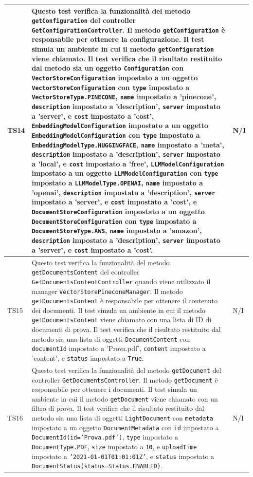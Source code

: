 \documentclass[10pt, a4paper]{article}
\begin{document}
\begin{xltabular}{\textwidth}{p{0.12\textwidth}|X|p{0.12\textwidth}}
    \hline
    TS14 & Questo test verifica la funzionalità del metodo \texttt{getConfiguration} del controller \texttt{GetConfigurationController}. Il metodo \texttt{getConfiguration} è responsabile per ottenere la configurazione. Il test simula un ambiente in cui il metodo \texttt{getConfiguration} viene chiamato. Il test verifica che il risultato restituito dal metodo sia un oggetto \texttt{Configuration} con \texttt{VectorStoreConfiguration} impostato a un oggetto \texttt{VectorStoreConfiguration} con \texttt{type} impostato a \texttt{VectorStoreType.PINECONE}, \texttt{name} impostato a 'pinecone', \texttt{description} impostato a 'description', \texttt{server} impostato a 'server', e \texttt{cost} impostato a 'cost', \texttt{EmbeddingModelConfiguration} impostato a un oggetto \texttt{EmbeddingModelConfiguration} con \texttt{type} impostato a \texttt{EmbeddingModelType.HUGGINGFACE}, \texttt{name} impostato a 'meta', \texttt{description} impostato a 'description', \texttt{server} impostato a 'local', e \texttt{cost} impostato a 'free', \texttt{LLMModelConfiguration} impostato a un oggetto \texttt{LLMModelConfiguration} con \texttt{type} impostato a \texttt{LLMModelType.OPENAI}, \texttt{name} impostato a 'openai', \texttt{description} impostato a 'description', \texttt{server} impostato a 'server', e \texttt{cost} impostato a 'cost', e \texttt{DocumentStoreConfiguration} impostato a un oggetto \texttt{DocumentStoreConfiguration} con \texttt{type} impostato a \texttt{DocumentStoreType.AWS}, \texttt{name} impostato a 'amazon', \texttt{description} impostato a 'description', \texttt{server} impostato a 'server', e \texttt{cost} impostato a 'cost'. & N/I \\
    \hline
    TS15 & Questo test verifica la funzionalità del metodo \texttt{getDocumentsContent} del controller \texttt{GetDocumentsContentController} quando viene utilizzato il manager \texttt{VectorStorePineconeManager}. Il metodo \texttt{getDocumentsContent} è responsabile per ottenere il contenuto dei documenti. Il test simula un ambiente in cui il metodo \texttt{getDocumentsContent} viene chiamato con una lista di ID di documenti di prova. Il test verifica che il risultato restituito dal metodo sia una lista di oggetti \texttt{DocumentContent} con \texttt{documentId} impostato a 'Prova.pdf', \texttt{content} impostato a 'content', e \texttt{status} impostato a \texttt{True}. & N/I \\
    \hline
    TS16 & Questo test verifica la funzionalità del metodo \texttt{getDocument} del controller \texttt{GetDocumentsController}. Il metodo \texttt{getDocument} è responsabile per ottenere i documenti. Il test simula un ambiente in cui il metodo \texttt{getDocument} viene chiamato con un filtro di prova. Il test verifica che il risultato restituito dal metodo sia una lista di oggetti \texttt{LightDocument} con \texttt{metadata} impostato a un oggetto \texttt{DocumentMetadata} con \texttt{id} impostato a \texttt{DocumentId(id='Prova.pdf')}, \texttt{type} impostato a \texttt{DocumentType.PDF}, \texttt{size} impostato a \texttt{10}, e \texttt{uploadTime} impostato a \texttt{'2021-01-01T01:01:01Z'}, e \texttt{status} impostato a \texttt{DocumentStatus(status=Status.ENABLED)}. & N/I \\

\end{xltabular}
\end{document}
